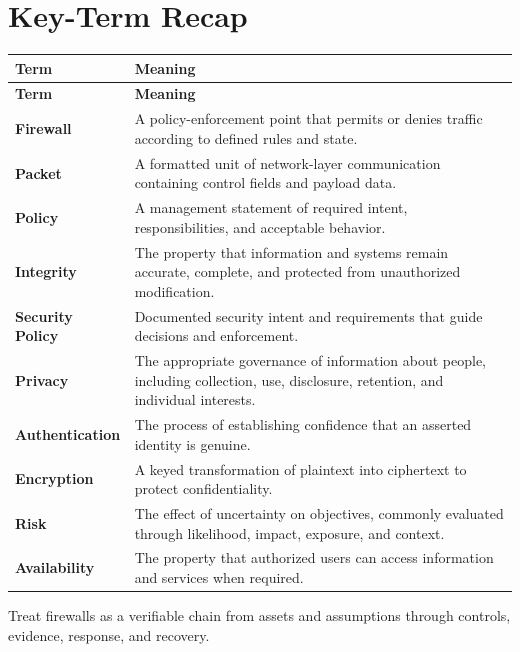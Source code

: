 \documentclass[11pt]{article}
\begin{document}
\section*{Key-Term Recap}
\begin{longtable}{>{\RaggedRight\arraybackslash}p{}>{\RaggedRight\arraybackslash}p{}}
\toprule\rowcolor{Navy}\color{white}\textbf{Term} & \color{white}\textbf{Meaning}\\\midrule
\endfirsthead
\toprule\rowcolor{Navy}\color{white}\textbf{Term} & \color{white}\textbf{Meaning}\\\midrule
\endhead
\textbf{Firewall} & A policy-enforcement point that permits or denies traffic according to defined rules and state. \\\midrule
\textbf{Packet} & A formatted unit of network-layer communication containing control fields and payload data. \\\midrule
\textbf{Policy} & A management statement of required intent, responsibilities, and acceptable behavior. \\\midrule
\textbf{Integrity} & The property that information and systems remain accurate, complete, and protected from unauthorized modification. \\\midrule
\textbf{Security Policy} & Documented security intent and requirements that guide decisions and enforcement. \\\midrule
\textbf{Privacy} & The appropriate governance of information about people, including collection, use, disclosure, retention, and individual interests. \\\midrule
\textbf{Authentication} & The process of establishing confidence that an asserted identity is genuine. \\\midrule
\textbf{Encryption} & A keyed transformation of plaintext into ciphertext to protect confidentiality. \\\midrule
\textbf{Risk} & The effect of uncertainty on objectives, commonly evaluated through likelihood, impact, exposure, and context. \\\midrule
\textbf{Availability} & The property that authorized users can access information and services when required. \\\midrule
\bottomrule
\end{longtable}
\begin{takeawaybox}
Treat firewalls as a verifiable chain from assets and assumptions through controls, evidence, response, and recovery.
\end{takeawaybox}
\end{document}
